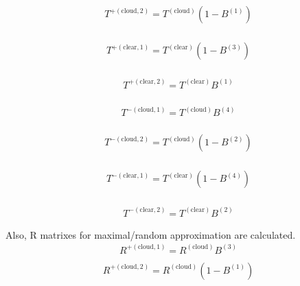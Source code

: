 \begin{equation}
\begin{array}{l}
T^{+(\text {cloud}, 2)}=T^{(\text {cloud})}\left(1-B^{(1)}\right)\\
\end{array}
\end{equation}

\begin{equation}
\begin{array}{l}
T^{+(\text {clear}, 1)}=T^{(\text {clear})}\left(1-B^{(3)}\right)\\
\end{array}
\end{equation}

\begin{equation}
\begin{array}{l}
T^{+(\text {clear}, 2)}=T^{(\text {clear})} B^{(1)} \\
\end{array}
\end{equation}

\begin{equation}
\begin{array}{l}
T^{-(\text {cloud}, 1)}=T^{(\text {cloud})} B^{(4)} \\
\end{array}
\end{equation}

\begin{equation}
\begin{array}{l}
T^{-(\text {cloud}, 2)}=T^{(\text {cloud})}\left(1-B^{(2)}\right)\\
\end{array}
\end{equation}

\begin{equation}
\begin{array}{l}
T^{-(\text {clear}, 1)}=T^{(\text {clear})}\left(1-B^{(4)}\right)\\
\end{array}
\end{equation}

\begin{equation}
\begin{array}{l}
T^{-(\text {clear}, 2)}=T^{(\text {clear})} B^{(2)}
\end{array}
\end{equation}

Also, R matrixes for maximal/random approximation are calculated. \begin{equation}
\begin{array}{l}
R^{+(\text {cloud}, 1)}=R^{(\text {cloud})} B^{(3)} \\
\end{array}
\end{equation} \begin{equation}
\begin{array}{l}
R^{+(\text {cloud}, 2)}=R^{(\text {cloud})}\left(1-B^{(1)}\right) \\
\end{array}
\end{equation}

